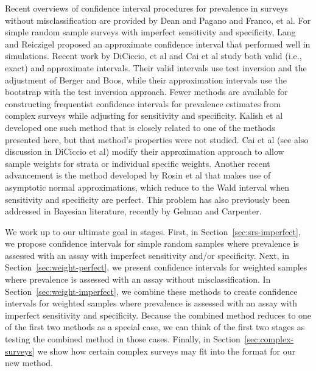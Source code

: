 Recent overviews of confidence interval procedures for prevalence in surveys without misclassification are provided by Dean and Pagano\cite{Dean:2015} and Franco, et al.\cite{franco2019}
For simple random sample surveys with imperfect sensitivity and specificity, Lang and Reiczigel\cite{Lang:2014} proposed an approximate confidence interval that performed well in simulations. Recent work by DiCiccio, et al \cite{DiCi:2021} and Cai et al\cite{Cai:2020} study both valid (i.e., exact) and approximate intervals. Their valid intervals use test inversion and the adjustment of Berger and Boos,\cite{Berg:1994} while their approximation intervals use the bootstrap with the test inversion approach.
Fewer methods are available for constructing frequentist confidence intervals for prevalence estimates from complex surveys while adjusting for sensitivity and specificity.
Kalish et al\cite{Kali:2021} developed one such method that is closely related to one of the methods presented here, but that method's properties were not studied.
Cai et al\cite{Cai:2020} (see also discussion in DiCiccio et al\cite{DiCi:2021}) modify their approximation approach to allow sample weights for strata or individual specific weights.
Another recent advancement is the method developed by Rosin et al\cite{rosin2021estimating} that makes use of asymptotic normal approximations, which reduce to the Wald interval when sensitivity and specificity are perfect.
This problem has also previously been addressed in Bayesian literature, recently by Gelman and Carpenter. \cite{GelmanBayes}

We work up to our ultimate goal in stages.
First, in Section~\ref{sec:srs-imperfect}, we propose confidence intervals for simple random samples where prevalence is assessed with an assay with imperfect sensitivity and/or specificity.
Next, in Section~\ref{sec:weight-perfect}, we present confidence intervals for weighted samples where prevalence is assessed with an assay without misclassification.
In Section~\ref{sec:weight-imperfect}, we combine these methods to create confidence intervals for weighted samples where prevalence is assessed with an assay with imperfect sensitivity and specificity.
Because the combined method reduces to one of the first two methods as a special case, we can think of the first two stages as testing the combined method in those cases.
Finally, in Section~\ref{sec:complex-surveys} we show how certain complex surveys may fit into the format for our new method.

